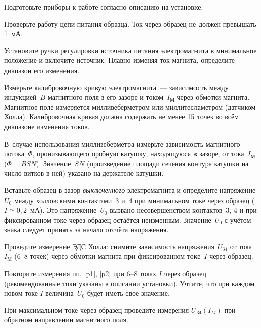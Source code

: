 \begin{lab:task}

\item Подготовьте приборы к работе согласно описанию на установке.

\item Проверьте работу цепи питания образца. Ток через образец не должен
превышать 1~мА.

\item Установите ручки регулировки источника питания электромагнита 
в минимальное положение и включите источник. 
Плавно изменяя ток магнита, определите диапазон его изменения.

\item Измерьте калибровочную кривую электромагнита~---
зависимость между индукцией~$B$ магнитного поля в его зазоре и 
током~$I_{М}$ через обмотки магнита.
Магнитное поле измеряется милливеберметром или миллитесламетром
(датчиком Холла). Калибровочная кривая должна содержать не менее
15 точек во всём диапазоне изменения токов.

В~случае использования милливеберметра измерьте зависимость 
магнитного потока~$\Phi$, пронизывающего пробную катушку, 
находящуюся в зазоре, от тока~$I_{М}$ ($\Phi=BSN$). 
Значение~$SN$ (произведение площади сечения контура катушки на
число витков в ней) указано на держателе катушки.

\item \label{p1} Вставьте образец в зазор \emph{выключенного} электромагнита 
и определите напряжение $U_0$ между холловскими
контактами~3 и~4 при минимальном токе через образец ($I\simeq 0,2$~мА). Это
напряжение~$U_0$ вызвано несовершенством контактов~3, 4 и при фиксированном токе
через образец остаётся неизменным. Значение~$U_0$ с учётом знака следует принять
за начало отсчёта напряжения.

\item \label{p2} Проведите измерение ЭДС Холла: снимите зависимость напряжения~$U_{34}$ 
от тока~$I_{М}$ (6--8 точек) через обмотки магнита при фиксированном токе~$I$ 
через образец.

\item Повторите измерения пп. \ref{p1}, \ref{p2} при 6--8 токах $I$ через образец
(рекомендованные токи указаны в описании установки).  
Учтите, что при каждом новом токе $I$ величина~$U_0$ будет иметь 
своё значение.

\item При максимальном токе через образец проведите измерения $U_{34}(I_{M})$ 
при обратном направлении магнитного поля.


\end{lab:task}
